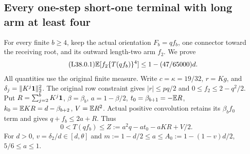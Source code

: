 \subsection{Every one-step short-one terminal with long arm at least four}\label{proof:Q5-C038}
For every finite $b\ge4$, keep the actual orientation $F_b=qf_b$,
one connector toward the receiving root, and its outward length-two
arm $f_2$. We prove
\begin{equation}\tag{L38.0.1}\label{eq:L38:claim}
\mathbb E[f_2\{T(qf_b)\}^4]\le1-(47/65000)d.
\end{equation}
All quantities use the original finite measure. Write $c=\kappa=19/32$,
$r=Kg$, and $\delta_j=\|K^j\mathbf1\|_2^2$.
The original row constraint gives $|r|\le pq/2$ and
$0\le f_2\le2-q^2/2$.
Put
$R=\sum_{j=2}^bK^j\mathbf1$, $\beta=\beta_b$,
$a=1-\beta/2$, $t_0=\beta_{b+1}=-\mathbb E R$,
$k_0=\mathbb E KR=d-\beta_{b+2}$, $V=\mathbb E R^2$.
Actual positive convolution retains its $\beta_bf_0$ term and gives
$q+f_b\le2a+R$. Thus
\begin{equation}\tag{L38.2.1}\label{eq:L38:envelope}
0<T(qf_b)\le Z:=a^2q-at_0-aKR+V/2.
\end{equation}
For $d>0$, $v=\delta_2/d\in[d,\theta]$ and
$m:=1-d/2\le a\le A_0:=1-(1-v)d/2$, $5/6\le a\le1$.

